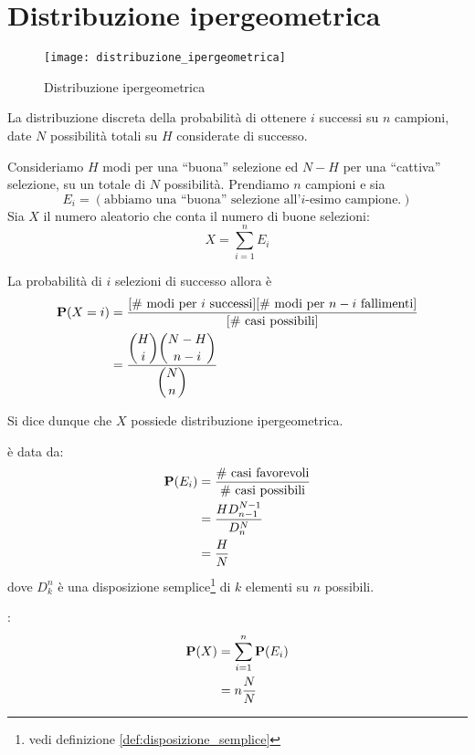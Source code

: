 \section{Distribuzione ipergeometrica} %
\begin{figure*}
  \texttt{[image: distribuzione\_ipergeometrica]}
  \caption{Distribuzione ipergeometrica} 
\end{figure*}

\begin{definition}
  \label{def:distribuzione_ipergeometrica}
  La distribuzione discreta della probabilità di ottenere \( i \) successi su \( n \) campioni, date \( N \) possibilità totali su \( H \) considerate di successo.
\end{definition}
Consideriamo \( H \) modi per una ``buona'' selezione ed \( N - H \) per una ``cattiva'' selezione, su un totale di \( N \) possibilità.
Prendiamo \( n \) campioni e sia
\[ E_i = (\text{abbiamo una ``buona'' selezione all'}i\text{-esimo campione.}) \]
Sia \( X \) il numero aleatorio che conta il numero di buone selezioni:
\[
  X = \sum_{i = 1}^n E_i
\]

La probabilità di \( i \) selezioni di successo allora è
\begin{align*}
  \mathbf{P}(X = i) &= \frac{[\text{\# modi per }i\text{ successi}][\text{\# modi per }n - i\text{ fallimenti}]}{[\text{\# casi possibili}]} \\
  &= \frac{\displaystyle \binom{H}{i} \binom{N-H}{n-i}}{\displaystyle \binom{N}{n}}
\end{align*}

Si dice dunque che \( X \) possiede distribuzione ipergeometrica.

 è data da:
\begin{align*}
  \mathbf{P}(E_i) &= \frac{\text{\# casi favorevoli}}{\text{\# casi possibili}} \\
  &= \frac{H D_{n-1}^{N-1}}{D_n^N} \\
  &= \frac{H}{N}
\end{align*}
dove \( D_k^n \) è una disposizione semplice\footnote{vedi definizione \ref{def:disposizione_semplice}} di \( k \) elementi su \( n \) possibili.

:
\begin{align*}
  \mathbf{P}(X) &= \sum_{i=1}^n \mathbf{P}(E_i) \\
  &= n \frac{N}{N}
\end{align*}


